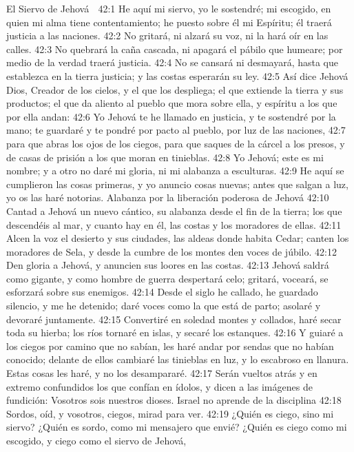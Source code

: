 El Siervo de Jehová  

42:1 He aquí mi siervo, yo le sostendré; mi escogido, en quien mi alma tiene contentamiento; he puesto sobre él mi Espíritu; él traerá justicia a las naciones. 
42:2 No gritará, ni alzará su voz, ni la hará oír en las calles.  
42:3 No quebrará la caña cascada, ni apagará el pábilo que humeare; por medio de la verdad traerá justicia.  
42:4 No se cansará ni desmayará, hasta que establezca en la tierra justicia; y las costas esperarán su ley.  
42:5 Así dice Jehová Dios, Creador de los cielos, y el que los despliega; el que extiende la tierra y sus productos; el que da aliento al pueblo que mora sobre ella, y espíritu a los que por ella andan:  
42:6 Yo Jehová te he llamado en justicia, y te sostendré por la mano; te guardaré y te pondré por pacto al pueblo, por luz de las naciones, 
42:7 para que abras los ojos de los ciegos, para que saques de la cárcel a los presos, y de casas de prisión a los que moran en tinieblas.  
42:8 Yo Jehová; este es mi nombre; y a otro no daré mi gloria, ni mi alabanza a esculturas.  
42:9 He aquí se cumplieron las cosas primeras, y yo anuncio cosas nuevas; antes que salgan a luz, yo os las haré notorias.  
Alabanza por la liberación poderosa de Jehová  
42:10 Cantad a Jehová un nuevo cántico, su alabanza desde el fin de la tierra; los que descendéis al mar, y cuanto hay en él, las costas y los moradores de ellas.  
42:11 Alcen la voz el desierto y sus ciudades, las aldeas donde habita Cedar; canten los moradores de Sela, y desde la cumbre de los montes den voces de júbilo.  
42:12 Den gloria a Jehová, y anuncien sus loores en las costas.  
42:13 Jehová saldrá como gigante, y como hombre de guerra despertará celo; gritará, voceará, se esforzará sobre sus enemigos.  
42:14 Desde el siglo he callado, he guardado silencio, y me he detenido; daré voces como la que está de parto; asolaré y devoraré juntamente.  
42:15 Convertiré en soledad montes y collados, haré secar toda su hierba; los ríos tornaré en islas, y secaré los estanques.  
42:16 Y guiaré a los ciegos por camino que no sabían, les haré andar por sendas que no habían conocido; delante de ellos cambiaré las tinieblas en luz, y lo escabroso en llanura. Estas cosas les haré, y no los desampararé.  
42:17 Serán vueltos atrás y en extremo confundidos los que confían en ídolos, y dicen a las imágenes de fundición: Vosotros sois nuestros dioses.  
Israel no aprende de la disciplina  
42:18 Sordos, oíd, y vosotros, ciegos, mirad para ver.  
42:19 ¿Quién es ciego, sino mi siervo? ¿Quién es sordo, como mi mensajero que envié? ¿Quién es ciego como mi escogido, y ciego como el siervo de Jehová,  
